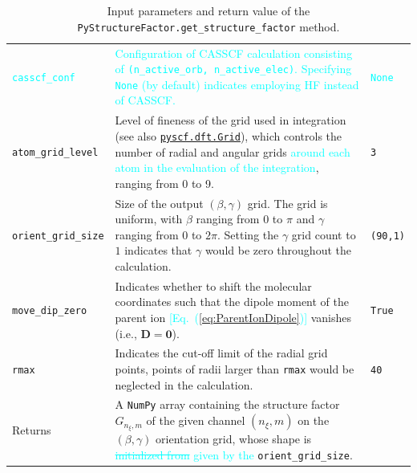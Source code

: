 \documentclass[preprint,12pt]{elsarticle} %
\newcommand{\bn}[1]{\mathbf{#1}}    %
\newcommand{\cyan}[1]{\textcolor{cyan}{#1}}     %
\newcommand{\cout}[1]{\textcolor{cyan}{\sout{#1}}}
\begin{document}
\begin{table}[tb]
\begin{tabular}{l p{9cm} l}
        \cyan{\texttt{casscf\_conf}}& \cyan{Configuration of CASSCF calculation consisting of \texttt{(n\_active\_orb, n\_active\_elec)}.
                                      Specifying \texttt{None} (by default) indicates employing HF instead of CASSCF.}                          & \cyan{\texttt{None}}\\
        \texttt{atom\_grid\_level}  & Level of fineness of the grid used in integration
                                      (see also \href{https://pyscf.org/pyscf_api_docs/pyscf.dft.html#module-pyscf.dft.gen_grid}{\texttt{pyscf.dft.Grid}}),
                                      which controls the number of radial and angular grids \cyan{around each atom in the evaluation of the integration},
                                      ranging from 0 to 9.
                                                                                                                                                & \texttt{3}        \\
        \texttt{orient\_grid\_size} & Size of the output $(\beta,\gamma)$ grid.
                                      The grid is uniform, with $\beta$ ranging from $0$ to $\pi$ and $\gamma$ ranging from $0$ to $2\pi$.
                                      Setting the $\gamma$ grid count to $1$ indicates that $\gamma$ would be zero throughout the calculation.
                                                                                                                                                & \texttt{(90,1)}   \\
        \texttt{move\_dip\_zero}    & Indicates whether to shift the molecular coordinates such that the dipole moment of the parent ion \cyan{[Eq.~(\ref{eq:ParentIonDipole})]} vanishes
                                      (i.e., $\bn{D}=\bn{0}$).
                                                                                                                                                & \texttt{True}     \\
        \texttt{rmax}               & Indicates the cut-off limit of the radial grid points,
                                      points of radii larger than \texttt{rmax} would be neglected in the calculation.
                                                                                                                                                & \texttt{40}       \\
        \hline
        Returns                     & A \texttt{NumPy} array containing the structure factor $G_{n_\xi,m}$ of the given channel $(n_\xi,m)$
                                      on the $(\beta,\gamma)$ orientation grid, whose shape is \cout{initialized from} \cyan{given by the} \texttt{orient\_grid\_size}. \\
        \hline \hline
    \end{tabular}
    \caption{Input parameters and return value of the \texttt{PyStructureFactor.get\_structure\_factor} method.}
    \label{tab:getsf_param}
\end{table}
\end{document}
